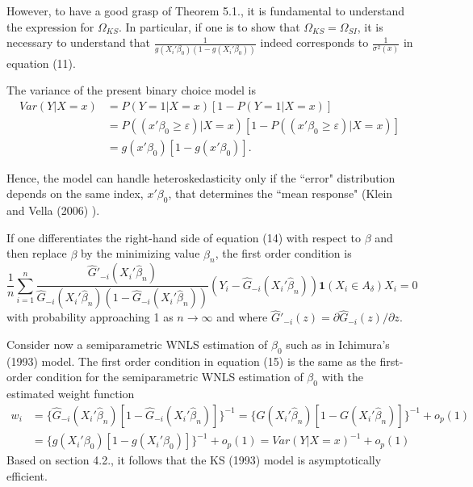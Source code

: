 However, to have a good grasp of Theorem 5.1., it is fundamental to understand the expression for $\Omega_{KS}$. In particular, if one is to show that $\Omega_{KS} = \Omega_{SI}$, it is necessary to understand that $\frac{1}{g(X_i'\beta_0)(1 - g(X_i'\beta_0))}$ indeed corresponds to $\frac{1}{\sigma^2(x)}$ in equation (11). 

The variance of the present binary choice model is %
\begin{align*}
Var(Y|X = x) & = P(Y = 1|X = x)[1 - P(Y = 1|X = x)] \\
&=P((x'\beta_0 \geq \varepsilon)|X = x)[1 - P((x'\beta_0 \geq \varepsilon)|X = x)] \\
&= g(x'\beta_0)[1 - g(x'\beta_0)].
\end{align*} 

Hence, the model can handle heteroskedasticity only if the ``error" distribution depends on the same index, $ x'\beta_0$, that determines the ``mean response" (Klein and Vella (2006) \cite{[25]}).

If one differentiates the right-hand side of equation (14) with respect to $\beta$ and then replace $\beta$ by the minimizing value $\hat{\beta}_n$, the first order condition is
\begin{equation}
\frac{1}{n} \sum_{i=1}^n \frac{\hat{G}'_{-i}(X_i'\hat{\beta}_n)}{\hat{G}_{-i}(X_i'\hat{\beta}_n)(1 - \hat{G}_{-i}(X_i'\hat{\beta}_n))} (Y_i - \hat{G}_{-i}(X_i'\hat{\beta}_n)) \mathbf{1}{(X_i \in A_\delta)} X_i = 0
\end{equation} 
with probability approaching 1 as $n \rightarrow \infty$ and where $\hat{G}'_{-i}(z) = \partial \hat{G}_{-i}(z) / \partial z$.

Consider now a semiparametric WNLS estimation of $\beta_0$ such as in Ichimura's (1993) \cite{[6]} model. The first order condition in equation (15) is the same as the first-order condition for the semiparametric WNLS estimation of $\beta_0$ with the estimated weight function
\begin{align*}
w_i & = \{ \hat{G}_{-i}(X_i'\hat{\beta}_n)[ 1 - \hat{G}_{-i}(X_i'\hat{\beta}_n)]\}^{-1} = \{ G(X_i'\hat{\beta}_n)[ 1 - G(X_i'\hat{\beta}_n)]\}^{-1} + o_p(1) \\
     & = \{ g(X_i'\beta_0)[ 1 - g(X_i'\beta_0)]\}^{-1} + o_p(1) = Var(Y|X = x)^{-1} + o_p(1)
\end{align*}
Based on section 4.2., it follows that the KS (1993) \cite{[12]} model is asymptotically efficient.

